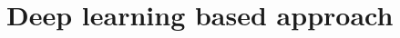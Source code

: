\documentclass[10pt,aspectratio=169]{beamer} %
\begin{document}
\section{Deep learning based approach}
\end{document}
